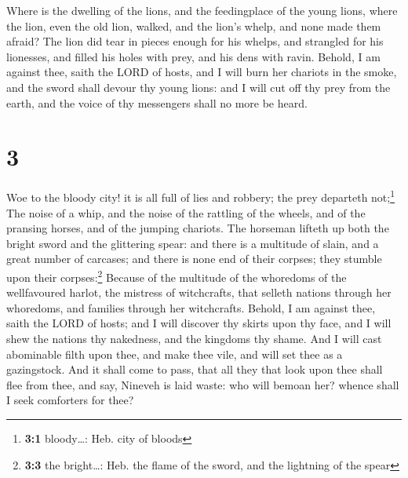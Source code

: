  Where is the dwelling of the lions, and the feedingplace
of the young lions, where the lion, even the old lion, walked, and the
lion's whelp, and none made them afraid?  The lion did
tear in pieces enough for his whelps, and strangled for his lionesses,
and filled his holes with prey, and his dens with ravin. 
Behold, I am against thee, saith the LORD of hosts, and I will burn her
chariots in the smoke, and the sword shall devour thy young lions: and I
will cut off thy prey from the earth, and the voice of thy messengers
shall no more be heard.

\hypertarget{section-2}{%
\section{3}\label{section-2}}

 Woe to the bloody city! it is all full of lies and
robbery; the prey departeth not;\footnote{\textbf{3:1} bloody\ldots:
  Heb. city of bloods}  The noise of a whip, and the noise
of the rattling of the wheels, and of the pransing horses, and of the
jumping chariots.  The horseman lifteth up both the bright
sword and the glittering spear: and there is a multitude of slain, and a
great number of carcases; and there is none end of their corpses; they
stumble upon their corpses:\footnote{\textbf{3:3} the bright\ldots: Heb.
  the flame of the sword, and the lightning of the spear} 
Because of the multitude of the whoredoms of the wellfavoured harlot,
the mistress of witchcrafts, that selleth nations through her whoredoms,
and families through her witchcrafts.  Behold, I am
against thee, saith the LORD of hosts; and I will discover thy skirts
upon thy face, and I will shew the nations thy nakedness, and the
kingdoms thy shame.  And I will cast abominable filth upon
thee, and make thee vile, and will set thee as a gazingstock.
 And it shall come to pass, that all they that look upon
thee shall flee from thee, and say, Nineveh is laid waste: who will
bemoan her? whence shall I seek comforters for thee?

